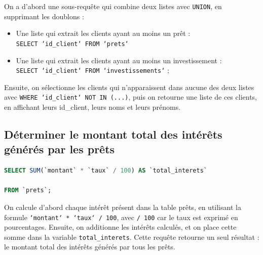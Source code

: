 \documentclass[12pt,a4paper]{article}
\begin{document}
On a d'abord une sous-requête qui combine deux listes avec \texttt{UNION}, en supprimant les doublons : \\


\begin{itemize}
	\item Une liste qui extrait les clients ayant au moins un prêt : \\ \texttt{SELECT `id\_client` FROM `prets`} \\
	\item Une liste qui extrait les clients ayant au moins un investissement : \\ \texttt{SELECT `id\_client` FROM `investissements`} ; \\
\end{itemize}

Ensuite, on sélectionne les clients qui n'apparaissent dans aucune des deux listes avec \texttt{WHERE `id\_client` NOT IN (...)}, puis on retourne une liste de ces clients, en affichant leurs id\_client, leurs noms et leurs prénoms.

	\subsection{Déterminer le montant total des intérêts générés par les prêts}
	
\begin{lstlisting}[language=SQL]
SELECT SUM(`montant` * `taux` / 100) AS `total_interets` 

FROM `prets`; 
\end{lstlisting}	

\vspace{.5cm}

On calcule d'abord chaque intérêt présent dans la table prêts, en utilisant la formule \texttt{`montant` * `taux` / 100}, avec \texttt{/ 100} car le taux est exprimé en pourcentages. Ensuite, on additionne les intérêts calculés, et on place cette somme dans la variable \texttt{total\_interets}. 
Cette requête retourne un seul résultat : le montant total des intérêts générés par tous les prêts. 

\newpage
	
\end{document}
